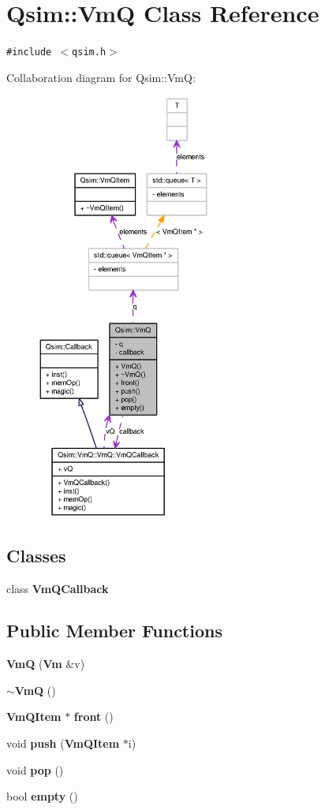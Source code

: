 \section{Qsim::VmQ Class Reference}
\label{classQsim_1_1VmQ}
{\tt \#include $<$qsim.h$>$}

Collaboration diagram for Qsim::VmQ:\nopagebreak
\begin{figure}[H]
\begin{center}
\leavevmode
\includegraphics[height=400pt]{classQsim_1_1VmQ__coll__graph}
\end{center}
\end{figure}
\subsection*{Classes}
\begin{CompactItemize}
\item 
class {\bf VmQCallback}
\end{CompactItemize}
\subsection*{Public Member Functions}
\begin{CompactItemize}
\item 
{\bf VmQ} ({\bf Vm} \&v)
\item 
{\bf $\sim$VmQ} ()
\item 
{\bf VmQItem} $\ast$ {\bf front} ()
\item 
void {\bf push} ({\bf VmQItem} $\ast$i)
\item 
void {\bf pop} ()
\item 
bool {\bf empty} ()
\end{CompactItemize}
